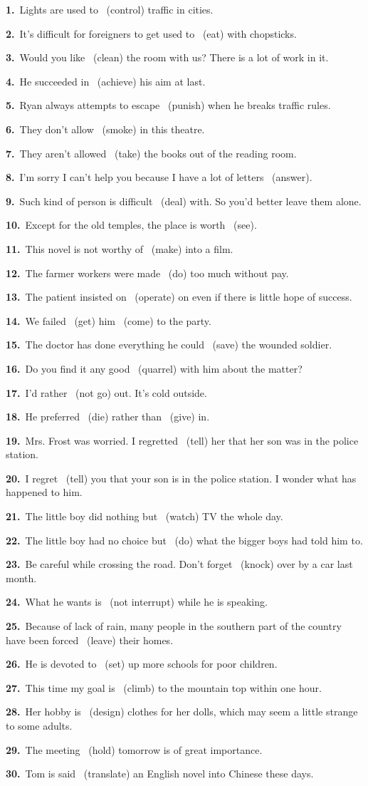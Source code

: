 \documentclass[10pt,a4paper]{article}
\newcommand{\STAR}{\textcolor{wrongred}{\starfont ★}}
\newcommand{\STARSLOT}[1]{\makebox[1.35em][l]{#1}}
\newcommand{\blank}{\underline{\hspace{1.8cm}}}
\newcommand{\ff}[3]{\noindent\STARSLOT{#2}\textbf{#1.}~#3\par\vspace{0.5em}}
\begin{document}
\vspace{0.45em}
\ff{1}{}{Lights are used to \blank\ (control) traffic in cities.}
\ff{2}{}{It's difficult for foreigners to get used to \blank\ (eat) with chopsticks.}
\ff{3}{}{Would you like \blank\ (clean) the room with us? There is a lot of work in it.}
\ff{4}{}{He succeeded in \blank\ (achieve) his aim at last.}
\ff{5}{\STAR}{Ryan always attempts to escape \blank\ (punish) when he breaks traffic rules.}
\ff{6}{}{They don't allow \blank\ (smoke) in this theatre.}
\ff{7}{}{They aren't allowed \blank\ (take) the books out of the reading room.}
\ff{8}{}{I'm sorry I can't help you because I have a lot of letters \blank\ (answer).}
\ff{9}{}{Such kind of person is difficult \blank\ (deal) with. So you'd better leave them alone.}
\ff{10}{}{Except for the old temples, the place is worth \blank\ (see).}
\ff{11}{\STAR}{This novel is not worthy of \blank\ (make) into a film.}
\ff{12}{}{The farmer workers were made \blank\ (do) too much without pay.}
\ff{13}{\STAR}{The patient insisted on \blank\ (operate) on even if there is little hope of success.}
\ff{14}{\STAR}{We failed \blank\ (get) him \blank\ (come) to the party.}
\ff{15}{}{The doctor has done everything he could \blank\ (save) the wounded soldier.}
\ff{16}{\STAR}{Do you find it any good \blank\ (quarrel) with him about the matter?}
\ff{17}{}{I'd rather \blank\ (not go) out. It's cold outside.}
\ff{18}{\STAR}{He preferred \blank\ (die) rather than \blank\ (give) in.}
\ff{19}{}{Mrs. Frost was worried. I regretted \blank\ (tell) her that her son was in the police station.}
\ff{20}{}{I regret \blank\ (tell) you that your son is in the police station. I wonder what has happened to him.}
\ff{21}{\STAR}{The little boy did nothing but \blank\ (watch) TV the whole day.}
\ff{22}{}{The little boy had no choice but \blank\ (do) what the bigger boys had told him to.}
\ff{23}{\STAR}{Be careful while crossing the road. Don't forget \blank\ (knock) over by a car last month.}
\ff{24}{}{What he wants is \blank\ (not interrupt) while he is speaking.}
\ff{25}{}{Because of lack of rain, many people in the southern part of the country have been forced \blank\ (leave) their homes.}
\ff{26}{}{He is devoted to \blank\ (set) up more schools for poor children.}
\ff{27}{}{This time my goal is \blank\ (climb) to the mountain top within one hour.}
\newpage
\ff{28}{\STAR}{Her hobby is \blank\ (design) clothes for her dolls, which may seem a little strange to some adults.}
\ff{29}{\STAR}{The meeting \blank\ (hold) tomorrow is of great importance.}
\ff{30}{\STAR}{Tom is said \blank\ (translate) an English novel into Chinese these days.}
\end{document}
